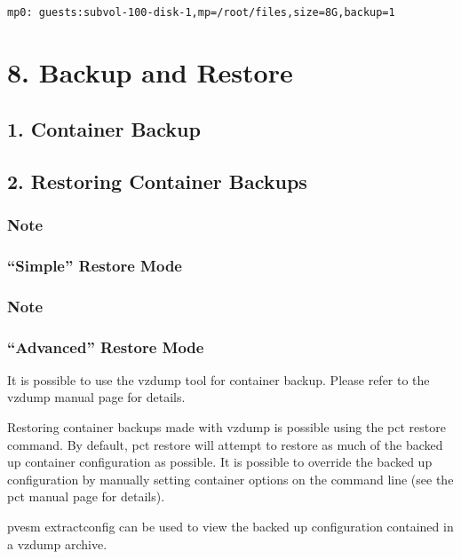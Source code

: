 \begin{lstlisting}

mp0: guests:subvol-100-disk-1,mp=/root/files,size=8G,backup=1

\end{lstlisting}


\section{8. Backup and Restore}

\subsection{1. Container Backup}

\subsection{2. Restoring Container Backups}

\subsubsection{Note}

\subsubsection{“Simple” Restore Mode}

\subsubsection{Note}

\subsubsection{“Advanced” Restore Mode}

It is possible to use the vzdump tool for container backup. Please refer to the vzdump manual page for details.

Restoring container backups made with vzdump is possible using the pct restore command. By default, pct restore will attempt to restore as much of the backed up container configuration as possible. It is possible to override the backed up configuration by manually setting container options on the command line (see the pct manual page for details).

pvesm extractconfig can be used to view the backed up configuration contained in a vzdump archive.

